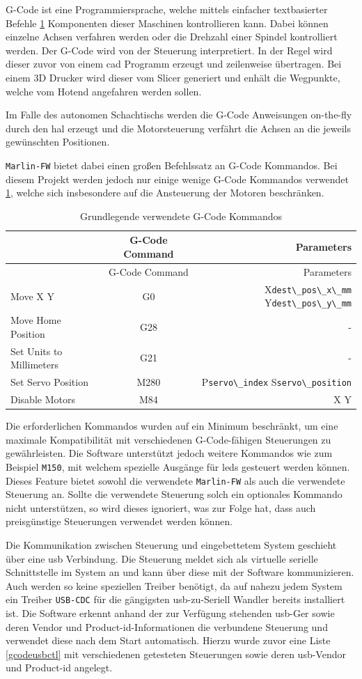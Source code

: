 G-Code ist eine Programmiersprache, welche mittels einfacher
textbasierter Befehle \ref{gcodecmd} Komponenten dieser Maschinen
kontrollieren kann. Dabei können einzelne Achsen verfahren werden oder
die Drehzahl einer Spindel kontrolliert werden. Der G-Code wird von der
Steuerung interpretiert. In der Regel wird dieser zuvor von einem
\gls{cad} Programm erzeugt und zeilenweise übertragen. Bei einem 3D
Drucker wird dieser vom Slicer generiert und enhält die Wegpunkte,
welche vom Hotend angefahren werden sollen.

Im Falle des autonomen Schachtischs werden die G-Code Anweisungen
on-the-fly durch den \gls{hal} erzeugt und die Motorsteuerung verfährt
die Achsen an die jeweils gewünschten Positionen.

\passthrough{\lstinline!Marlin-FW!} bietet dabei einen großen
Befehlssatz an G-Code Kommandos. Bei diesem Projekt werden jedoch nur
einige wenige G-Code Kommandos verwendet \ref{gcodecmd}, welche sich
insbesondere auf die Ansteuerung der Motoren beschränken.

\begin{longtable}[]{@{}lcr@{}}
\caption{Grundlegende verwendete G-Code Kommandos
\label{gcodecmd}}\tabularnewline
\toprule
& G-Code Command & Parameters\tabularnewline
\midrule
\endfirsthead
\toprule
& G-Code Command & Parameters\tabularnewline
\midrule
\endhead
Move X Y & G0 & X\passthrough{\lstinline!dest\_pos\_x\_mm!}
Y\passthrough{\lstinline!dest\_pos\_y\_mm!}\tabularnewline
Move Home Position & G28 & -\tabularnewline
Set Units to Millimeters & G21 & -\tabularnewline
Set Servo Position & M280 & P\passthrough{\lstinline!servo\_index!}
S\passthrough{\lstinline!servo\_position!}\tabularnewline
Disable Motors & M84 & X Y\tabularnewline
\bottomrule
\end{longtable}

Die erforderlichen Kommandos wurden auf ein Minimum beschränkt, um eine
maximale Kompatibilität mit verschiedenen G-Code-fähigen Steuerungen zu
gewährleisten. Die Software unterstützt jedoch weitere Kommandos wie zum
Beispiel \passthrough{\lstinline!M150!}, mit welchem spezielle Ausgänge
für \gls{led}s gesteuert werden können. Dieses Feature bietet sowohl die
verwendete \passthrough{\lstinline!Marlin-FW!} als auch die verwendete
Steuerung an. Sollte die verwendete Steuerung solch ein optionales
Kommando nicht unterstützen, so wird dieses ignoriert, was zur Folge
hat, dass auch preisgünstige Steuerungen verwendet werden können.

Die Kommunikation zwischen Steuerung und eingebettetem System geschieht
über eine \gls{usb} Verbindung. Die Steuerung meldet sich als virtuelle
serielle Schnittstelle im System an und kann über diese mit der Software
kommunizieren. Auch werden so keine speziellen Treiber benötigt, da auf
nahezu jedem System ein Treiber \passthrough{\lstinline!USB-CDC!} für
die gängigsten \gls{usb}-zu-Seriell Wandler bereits installiert ist. Die
Software erkennt anhand der zur Verfügung stehenden \gls{usb}-Ger sowie
deren Vendor und Product-\gls{id}-Informationen die verbundene Steuerung
und verwendet diese nach dem Start automatisch. Hierzu wurde zuvor eine
Liste \ref{gcodeusbctl} mit verschiedenen getesteten Steuerungen sowie
deren \gls{usb}-Vendor und Product-\gls{id} angelegt.

